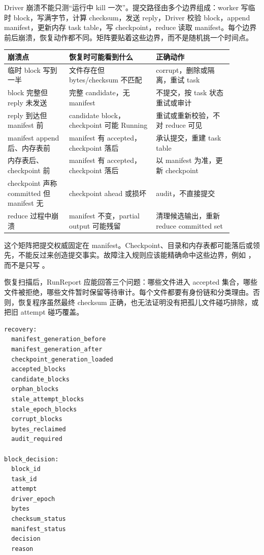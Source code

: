 Driver 崩溃不能只测“运行中 kill 一次”。提交路径由多个边界组成：worker 写临时 block，写满字节，计算 checksum，发送 reply，Driver 校验 block，append manifest，更新内存 task table，写 checkpoint，reduce 读取 manifest。每个边界前后崩溃，恢复动作都不同。矩阵要贴着这些边界，而不是随机挑一个时间点。

\begin{center}
\small
\begin{tabular}{@{}p{0.24\linewidth}p{0.34\linewidth}p{0.30\linewidth}@{}}
\toprule
崩溃点 & 恢复时可能看到什么 & 正确动作 \\
\midrule
临时 block 写到一半 & 文件存在但 bytes/checksum 不匹配 & corrupt，删除或隔离，重试 task \\
block 完整但 reply 未发送 & 完整 candidate，无 manifest & 不提交，按 task 状态重试或审计 \\
reply 到达但 manifest 前 & candidate block，checkpoint 可能 Running & 重试或重新校验，不对 reduce 可见 \\
manifest append 后、内存表前 & manifest 有 accepted，checkpoint 落后 & 承认提交，重建 task table \\
内存表后、checkpoint 前 & manifest 有 accepted，checkpoint 落后 & 以 manifest 为准，更新 checkpoint \\
checkpoint 声称 committed 但 manifest 无 & checkpoint ahead 或损坏 & audit，不直接提交 \\
reduce 过程中崩溃 & manifest 不变，partial output 可能残留 & 清理候选输出，重新 reduce committed set \\
\bottomrule
\end{tabular}
\end{center}

这个矩阵把提交权威固定在 manifest。Checkpoint、目录和内存表都可能落后或领先，不能反过来创造提交事实。故障注入规则应该能精确命中这些边界，例如 ，而不是只写 。

恢复扫描后，RunReport 应能回答三个问题：哪些文件进入 accepted 集合，哪些文件被拒绝，哪些文件暂时保留等待审计。每个文件都要有身份链和分类理由。否则，恢复程序虽然最终 checksum 正确，也无法证明没有把孤儿文件碰巧排除，或把旧 attempt 碰巧覆盖。

\begin{lstlisting}[numbers=none,caption={RecoveryReport 的语义字段}]
recovery:
  manifest_generation_before
  manifest_generation_after
  checkpoint_generation_loaded
  accepted_blocks
  candidate_blocks
  orphan_blocks
  stale_attempt_blocks
  stale_epoch_blocks
  corrupt_blocks
  bytes_reclaimed
  audit_required

block_decision:
  block_id
  task_id
  attempt
  driver_epoch
  bytes
  checksum_status
  manifest_status
  decision
  reason
\end{lstlisting}

